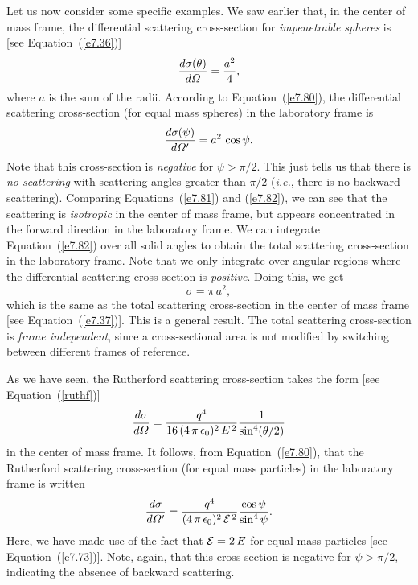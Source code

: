 Let us now consider some specific examples. We saw earlier that, in the
center of mass frame, the
differential scattering cross-section for {\em impenetrable spheres}\/  is [see Equation~(\ref{e7.36})]
\begin{equation}\label{e7.81}
\frac{d\sigma(\theta)}{d{\mit\Omega}} = \frac{a^2}{4},
\end{equation}
where $a$ is the sum of the radii. According to Equation~(\ref{e7.80}),
the differential scattering cross-section (for equal mass spheres) in the laboratory frame is 
\begin{equation}\label{e7.82}
\frac{d\sigma(\psi)}{d{\mit\Omega}'} = a^2\,\cos\psi.
\end{equation}
Note that this cross-section is {\em negative}\/ for $\psi>\pi/2$. This
just tells us that there is {\em no scattering}\/ with scattering angles
greater than $\pi/2$ ({\em i.e.}, there is no backward scattering).
Comparing Equations~(\ref{e7.81}) and (\ref{e7.82}), we can see that
the scattering is {\em isotropic}\/ in the center of mass frame, but appears
concentrated in the forward direction in the laboratory frame.
We can integrate Equation~(\ref{e7.82}) over all solid angles to obtain the
total scattering cross-section in the laboratory frame. Note that we
only integrate over angular regions where the differential scattering
cross-section is {\em positive}. Doing this, we get
\begin{equation}
\sigma = \pi\,a^2,
\end{equation}
which is the same as the total scattering cross-section in the center of mass
frame [see Equation~(\ref{e7.37})]. This is a general result. The total scattering cross-section is
{\em frame independent}, since a cross-sectional area is not modified by
switching between different frames of reference.

As we have seen, the Rutherford scattering cross-section  takes
the form [see Equation~(\ref{ruthf})]
\begin{equation}
\frac{d\sigma}{d{\mit\Omega}} = \frac{q^4}{16\,(4\,\pi\,\epsilon_0)^2\,E^{\,2}}\frac{1}{\sin^4(\theta/2)}
\end{equation}
in the center of mass frame.
It follows, from Equation~(\ref{e7.80}), that the Rutherford scattering
cross-section (for equal mass particles) in the laboratory frame is written
\begin{equation}
\frac{d\sigma}{d{\mit\Omega}'} = \frac{q^4}{(4\,\pi\,\epsilon_0)^2\,{\cal E}^{\,2}}\frac{\cos\psi}{\sin^4\psi}.
\end{equation}
Here, we have made use of the fact that ${\cal E} = 2\,E$ for equal
mass particles [see Equation~(\ref{e7.73})]. Note, again, that this cross-section is negative
for $\psi>\pi/2$, indicating the absence of backward scattering.

